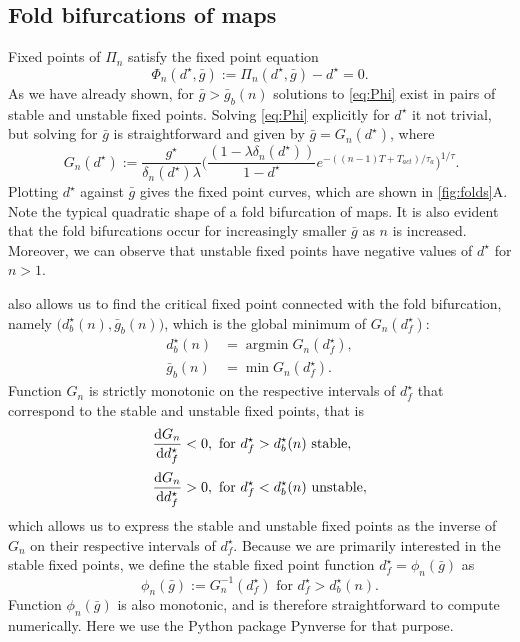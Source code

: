 \subsection{Fold bifurcations of maps}
Fixed points of $\Pi_n$ satisfy the fixed point equation
\begin{equation}
	\label{eq:Phi}
	\Phi_n(d^\star, \bar g) := \Pi_n(d^\star, \bar g)-d^\star = 0.
\end{equation}
As we have already shown, for $\bar g > \bar g_b(n)$ solutions to \cref{eq:Phi} exist in pairs of stable and unstable fixed points.
Solving \cref{eq:Phi} explicitly for $d^\star$ it not trivial, but solving for $\bar g$ is straightforward and given by $\bar g= G_n(d^\star)$, where
\begin{equation}
	~\label{eq:g}
	G_{n}(d^{\star}) :=
	\frac{g^{\star}}{\delta_n(d^\star)\lambda}
	\Big(
	\frac{(1-\lambda\delta_n(d^\star)) }{1-d^\star} e^{-((n-1)T + T_{act})/\tau_a}
	\Big)^{1/\tau}.
\end{equation}
Plotting $d^\star$ against $\bar g$ gives the fixed point curves, which are shown in \cref{fig:folds}A.
Note the typical quadratic shape of a fold bifurcation of maps.
It is also evident that the fold bifurcations occur for increasingly smaller $\bar g$ as $n$ is increased.
Moreover, we can observe that unstable fixed points have negative values of $d^\star$ for $n>1$.

 also allows us to find the critical fixed point connected with the fold bifurcation, namely $\big(d^\star_b(n), \bar g_b(n)\big)$, which is the global minimum
of $G_n(d^\star_f)$:
\begin{align}
	d^\star_b(n) & = \operatorname{argmin} G_n(d^\star_f), \\
	\bar g_b(n)  & = \min{G_n(d^\star_f)}.
\end{align}
Function $G_n$ is strictly monotonic on the respective intervals of $d^\star_f$ that correspond to the stable and unstable fixed points, that is
\begin{align}
	\dv{G_n}{d^\star_f} & < 0, \text{ for } d^\star_f>d^\star_b(n) \text{ stable},   \\[0.5ex]
	\dv{G_n}{d^\star_f} & > 0, \text{ for } d^\star_f<d^\star_b(n) \text{ unstable},
\end{align}
which allows us to express the stable and unstable fixed points as the inverse of $G_n$ on their respective intervals of $d^\star_f$.
Because we are primarily interested in the stable fixed points, we define the stable fixed point function $d^\star_f = \phi_n(\bar g)$ as
\begin{equation}
	\label{eq:phi}
	\phi_n(\bar g):= G_n^{-1}(d^\star_f) \text{ for } d^\star_f>d^\star_b(n).
\end{equation}
Function $\phi_n(\bar g)$ is also monotonic, and is therefore straightforward to compute numerically.
Here we use the Python package Pynverse \citep{pynverse} for that purpose.

